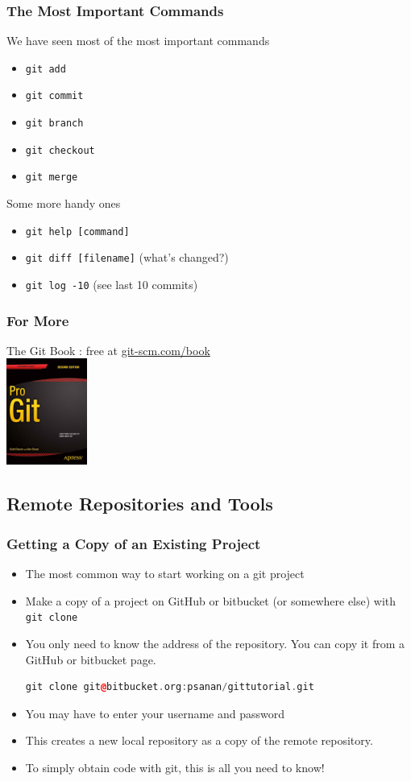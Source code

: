 \documentclass{beamer}
\begin{document}
\begin{frame}[fragile]
\frametitle{The Most Important Commands}
We have seen most of the most important commands
\begin{itemize}
\item \lstinline{git add}
\item \lstinline{git commit}
\item \lstinline{git branch}
\item \lstinline{git checkout}
\item \lstinline{git merge}
\end{itemize}

Some more handy ones
\begin{itemize}
\item \lstinline{git help [command]}
\item \lstinline{git diff [filename]} (what's changed?)
\item \lstinline{git log -10} (see last 10 commits)
\end{itemize}
\end{frame}

\begin{frame}[fragile]
\frametitle{For More}
The Git Book : free at \href{https://git-scm.com/book}{git-scm.com/book} \\
\includegraphics[width=100px]{progit2}
\end{frame}

\subsection{Remote Repositories and Tools}

\begin{frame}[fragile]
\frametitle{Getting a Copy of an Existing Project}
\begin{itemize}
\item
The most common way to start working on a git project 
\item Make a copy of a project on GitHub or bitbucket (or somewhere else) with \lstinline{git clone}
\item You only need to know the address of the repository. You can copy it from a GitHub or bitbucket page.
\begin{lstlisting}[language=C++]
git clone git@bitbucket.org:psanan/gittutorial.git
\end{lstlisting}
\item You may have to enter your username and password
\item This creates a new local repository as a copy of the remote repository.
\item To simply obtain code with git, this is all you need to know!
\end{itemize}
\end{frame}
\end{document}
